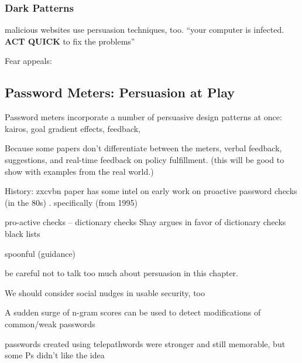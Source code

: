 	\subsubsection{Dark Patterns}
	malicious websites use persuasion techniques, too. ``your computer is infected. \textbf{ACT QUICK} to fix the problems''
	
	Fear appeals: \cite{Xu2007FearAppeals}
	\cite{Muscanell2014WeaponsMisused}

	\subsection{Password Meters: Persuasion at Play}\label{sec:rw:password-meters}
	Password meters incorporate a number of persuasive design patterns at once: kairos, goal gradient effects, feedback, 
	
	 Because some papers don't differentiate between the meters, verbal feedback, suggestions, and real-time feedback on policy fulfillment. (this will be good to show with examples from the real world.)
	
	
	
	History: zxcvbn paper has some intel on early work on proactive password checks (in the 80s) \cite{Wheeler2016zxcvbn}. specifically (from 1995) \cite{Bishop1995ProactivePasswordChecking}
	
	
	pro-active checks -- dictionary checks Shay argues in favor of dictionary checks \cite{Shay2014CanLongPasswordsBeSecureAndUsable} 
	black lists \cite{Habib2017Blacklists} 
	
	spoonful (guidance) \cite{Shay2015SpoonfulOfSugar}
	\cite{Forget2008ImprovingPasswordsThroughPersuasion}
	
	be careful not to talk too much about persuasion in this chapter. 
	
	We should consider social nudges in usable security, too \cite{DiGioia2005SocialNavigationUsableSecurity}
	
	
	A sudden surge of n-gram scores can be used to detect modifications of common/weak passwords \cite{Tupsamudre2016MarkovStrength}
	
	
	passwords created using telepathwords were stronger and still memorable, but some Ps didn't like the idea \cite{Komanduri2014Telepathwords}
	
